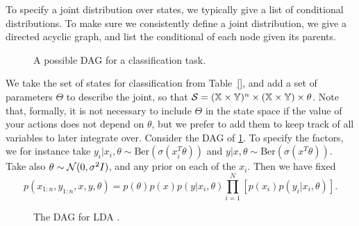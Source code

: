 To specify a joint distribution over states, we typically give a list of conditional distributions. 
To make sure we consistently define a joint distribution, we give a directed acyclic graph, and list the conditional of each node given its parents.

\begin{figure}[!ht]
    \centering
  \caption{A possible DAG for a classification task.}
  \label{f:classification_dag}
\end{figure}

\begin{example}
    \label{ex:classification}
    We take the set of states for classification from Table~\ref{}, and add a set of parameters $\Theta$ to describe the joint, so that $\mathcal{S} = (\mathbb{X}\times\mathbb{Y})^n \times (\mathbb{X}\times\mathbb{Y}) \times \theta$.
    Note that, formally, it is not necessary to include $\Theta$ in the state space if the value of your actions does not depend on $\theta$, but we prefer to add them to keep track of all variables to later integrate over.
    Consider the DAG of \cref{f:classification_dag}.
    To specify the factors, we for instance take $y_i\vert x_i, \theta \sim \mathrm{Ber}(\sigma(x_i^T\theta))$ and $y\vert x, \theta \sim \mathrm{Ber}(\sigma(x^T\theta))$. Take also $\theta\sim \mathcal{N}(0,\sigma^2 I)$, and any prior on each of the $x_i$.
    Then we have fixed
    $$
        p(x_{1:n}, y_{1:n}, x, y, \theta) = p(\theta) p(x) p(y\vert x_i, \theta) \prod_{i=1}^N \left[p(x_i) p(y_i\vert x_i, \theta)\right].
    $$
\end{example}

\begin{figure}[!ht]
    \centering
  \caption{The DAG for LDA \citep{}.}
  \label{f:lda_dag}
\end{figure}

